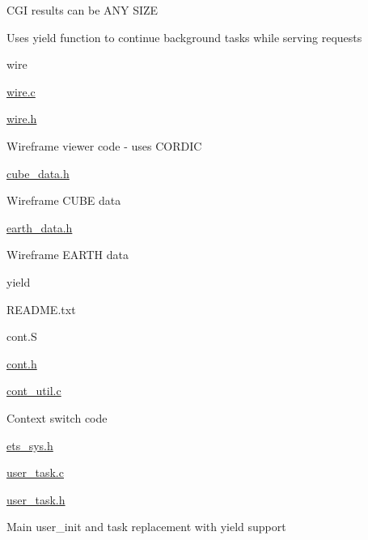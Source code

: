 \begin{DoxyItemize}
\begin{DoxyItemize}
\begin{DoxyItemize}
\begin{DoxyItemize}
\begin{DoxyItemize}
\end{DoxyItemize}
\end{DoxyItemize}
\item C\-G\-I results can be A\-N\-Y S\-I\-Z\-E
\item Uses yield function to continue background tasks while serving requests
\end{DoxyItemize}
\end{DoxyItemize}
\item wire
\begin{DoxyItemize}
\item \hyperlink{wire_8c}{wire.\-c}
\item \hyperlink{wire_8h}{wire.\-h}
\begin{DoxyItemize}
\item Wireframe viewer code -\/ uses C\-O\-R\-D\-I\-C
\end{DoxyItemize}
\item \hyperlink{cube__data_8h}{cube\-\_\-data.\-h}
\begin{DoxyItemize}
\item Wireframe C\-U\-B\-E data
\end{DoxyItemize}
\item \hyperlink{earth__data_8h}{earth\-\_\-data.\-h}
\begin{DoxyItemize}
\item Wireframe E\-A\-R\-T\-H data
\end{DoxyItemize}
\end{DoxyItemize}
\item yield
\begin{DoxyItemize}
\item R\-E\-A\-D\-M\-E.\-txt
\item cont.\-S
\item \hyperlink{cont_8h}{cont.\-h}
\item \hyperlink{cont__util_8c}{cont\-\_\-util.\-c}
\begin{DoxyItemize}
\item Context switch code
\end{DoxyItemize}
\item \hyperlink{ets__sys_8h}{ets\-\_\-sys.\-h}
\item \hyperlink{user__task_8c}{user\-\_\-task.\-c}
\item \hyperlink{user__task_8h}{user\-\_\-task.\-h}
\begin{DoxyItemize}
\item Main user\-\_\-init and task replacement with yield support
\end{DoxyItemize}
\end{DoxyItemize}
\end{DoxyItemize}

